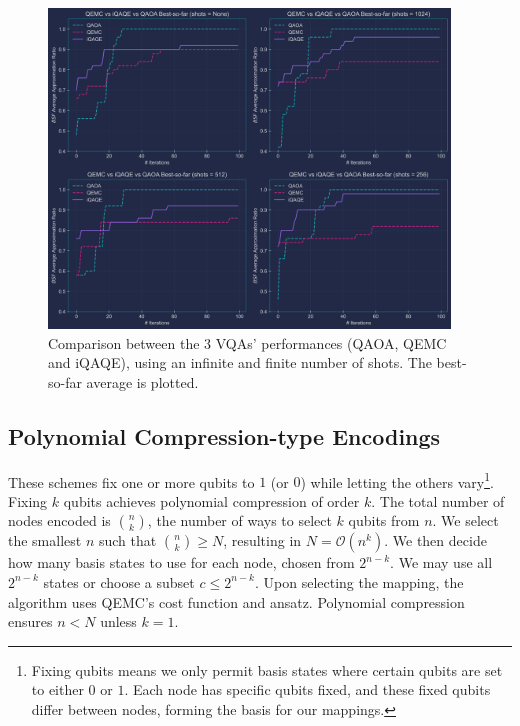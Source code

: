 \begin{figure}[t]
    \centering
    \includegraphics[width=0.95\textwidth]{Figures/Random_iQAQE_Updated.png}
    \caption{Comparison between the $3$ VQAs' performances (QAOA, QEMC and iQAQE), using an infinite and finite number of shots. The best-so-far average is plotted.}
    \label{fig:3_Comparison_shots}
\end{figure}

\subsection{Polynomial Compression-type Encodings}
\label{subsection:Polynomial_Encodings}
These schemes fix one or more qubits to $1$ (or $0$) while letting the others vary\footnote{Fixing qubits means we only permit basis states where certain qubits are set to either $0$ or $1$. Each node has specific qubits fixed, and these fixed qubits differ between nodes, forming the basis for our mappings.}. Fixing $k$ qubits achieves polynomial compression of order $k$. The total number of nodes encoded is $\binom{n}{k}$, the number of ways to select $k$ qubits from $n$. We select the smallest $n$ such that $\binom{n}{k} \geq N$, resulting in $N = \mathcal{O}(n^k)$. We then decide how many basis states to use for each node, chosen from $2^{n-k}$. We may use all $2^{n-k}$ states or choose a subset $c \leq 2^{n-k}$. Upon selecting the mapping, the algorithm uses QEMC's cost function and ansatz. Polynomial compression ensures $n < N$ unless $k = 1$.

